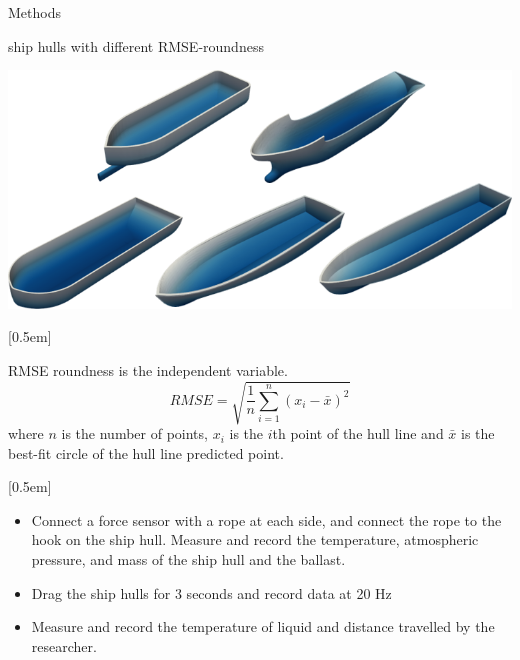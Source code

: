 \documentclass[final, 20pt]{beamer}
\newlength{\colwidth}
\newlength{\twocolwidth}
\begin{document}
\begin{frame}[t]
\begin{columns}[t]
\begin{column}{\twocolwidth}
\begin{block}{Methods}
\begin{multicols}{2}
\begin{minipage}[t]{0.48\linewidth}
            ship hulls with different RMSE-roundness

            \centering
            \includegraphics[width=0.5\linewidth]{images/experiment-ship-hulls.png}
          \end{minipage}


          [0.5em]

          RMSE roundness is the independent variable.
          \begin{equation}
            \label{eq:rmse}
            RMSE = \sqrt{\frac{1}{n}\sum_{i=1}^{n}(x_i - \bar{x})^2}
          \end{equation}
          where $n$ is the number of points, $x_i$ is the $i$th point of the hull line and $\bar{x}$ is the best-fit circle  of the hull line predicted point.


          [0.5em]

          \begin{itemize}
            \item Connect a force sensor with a rope at each side, and connect the rope to the hook on the ship hull. Measure and record the temperature, atmospheric pressure, and mass of the ship hull and the ballast.
            \item Drag the ship hulls for 3 seconds and record data at 20 Hz
            \item Measure and record the temperature of liquid and distance travelled by the researcher.
          \end{itemize}


\end{multicols}
\end{block}
\end{column}
\end{columns}
\end{frame}
\end{document}
